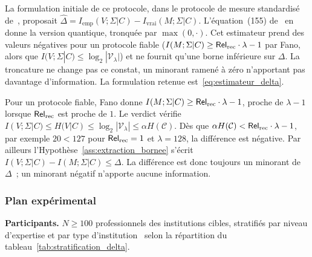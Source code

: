 \begin{sloppypar}
\begin{remark}
La formulation initiale de ce protocole, dans le protocole de mesure standardis\'e
de~\cite{MINKA2026CRO}, proposait
$\hat{\Delta} = I_{\mathrm{emp}}(V;\Sigma|C) - I_{\mathrm{vrai}}(M;\Sigma|C)$.
L'\'equation~(155) de~\cite{MINKA2026PQCRO} en donne la version quantique, tronqu\'ee par
$\max(0,\cdot)$.
Cet estimateur prend des valeurs n\'egatives pour un protocole fiable
($I(M;\Sigma|C) \geq \mathsf{Rel}_{\mathrm{rec}}\cdot\lambda - 1$ par Fano, alors que
$I(V;\Sigma|C) \leq \log_2|\mathcal{V}_\lambda|$) et ne fournit qu'une borne
inf\'erieure sur $\Delta$. La troncature ne change pas ce constat, un minorant ramen\'e \`a z\'ero
n'apportant pas davantage d'information. La formulation retenue
est~\eqref{eq:estimateur_delta}.
\end{remark}

\begin{Preuve}
Pour un protocole fiable, Fano donne $I(M;\Sigma|C) \geq \mathsf{Rel}_{\mathrm{rec}}\cdot\lambda - 1$,
proche de $\lambda - 1$ lorsque $\mathsf{Rel}_{\mathrm{rec}}$ est proche de $1$. Le verdict v\'erifie
$I(V;\Sigma|C) \leq H(V|C) \leq \log_2|\mathcal{V}_\lambda| \leq \alpha H(\mathcal{C})$.
D\`es que $\alpha H(\mathcal{C}) < \mathsf{Rel}_{\mathrm{rec}}\cdot\lambda - 1$, par exemple $20 < 127$ pour
$\mathsf{Rel}_{\mathrm{rec}} = 1$ et $\lambda = 128$, la diff\'erence est n\'egative. Par ailleurs
l'Hypoth\`ese~\ref{ass:extraction_bornee} s'\'ecrit
$I(V;\Sigma|C) - I(M;\Sigma|C) \leq \Delta$. La diff\'erence est donc toujours un
minorant de $\Delta$~; un minorant n\'egatif n'apporte aucune information.
\end{Preuve}

\subsubsection{Plan exp\'erimental}
\label{subsubsec:design_delta}

\noindent\textbf{Participants.} $N \geq 100$ professionnels des institutions
cibles, stratifi\'es par niveau d'expertise et par type
d'institution~\cite{MINKA2026CRO} selon la r\'epartition du
tableau~\ref{tab:stratification_delta}.


\end{sloppypar}
